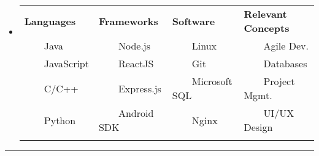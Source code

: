 \documentclass[11pt,a4paper]{article}
\newcommand{\tabitem}{~~\llap{--}~~}
\newenvironment{indentsection}[1]%
{\begin{list}{}%
	{\setlength{\leftmargin}{1.7#1}}%
	\item[]%
}
{\end{list}}
\begin{document}
\begin{itemize}[leftmargin=*]
	\parskip=0.1em	

\item[]

\begin{tabularx}{\textwidth}{X X X X}

\textbf{Languages} & \textbf{Frameworks} & \textbf{Software} & \textbf{Relevant Concepts}\\
\tabitem Java & \tabitem Node.js & \tabitem Linux & \tabitem Agile Dev.\\
\tabitem JavaScript & \tabitem ReactJS  & \tabitem Git & \tabitem Databases\\	
\tabitem C/C++ & \tabitem Express.js  & \tabitem Microsoft SQL & \tabitem Project Mgmt.\\
\tabitem Python & \tabitem Android SDK & \tabitem Nginx & \tabitem UI/UX Design\\
\\




\end{tabularx}

\end{itemize}



\vspace{-1.1em}
\hrule %
\vspace{-0.3em}
\end{document}
